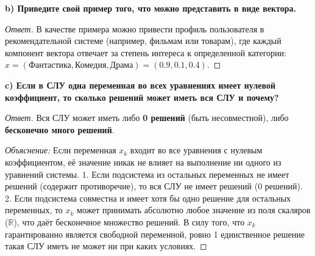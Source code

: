 \documentclass[11pt, a4paper]{article}
\begin{document}
\textbf{b) Приведите свой пример того, что можно представить в виде вектора.}
\begin{proof}[Ответ]
В качестве примера можно привести профиль пользователя в рекомендательной системе (например, фильмам или товарам), где каждый компонент вектора отвечает за степень интереса к определенной категории: $x = (\text{Фантастика}, \text{Комедия}, \text{Драма}) = (0.9, 0.1, 0.4)$.
\end{proof}

\textbf{c) Если в СЛУ одна переменная во всех уравнениях имеет нулевой коэффициент, то сколько решений может иметь вся СЛУ и почему?}
\begin{proof}[Ответ]
Вся СЛУ может иметь либо \textbf{0 решений} (быть несовместной), либо \textbf{бесконечно много решений}. 

\textit{Объяснение:} Если переменная $x_k$ входит во все уравнения с нулевым коэффициентом, её значение никак не влияет на выполнение ни одного из уравнений системы.
1. Если подсистема из остальных переменных не имеет решений (содержит противоречие), то вся СЛУ не имеет решений ($0$ решений).
2. Если подсистема совместна и имеет хотя бы одно решение для остальных переменных, то $x_k$ может принимать абсолютно любое значение из поля скаляров ($\mathbb{R}$), что даёт бесконечное множество решений. В силу того, что $x_k$ гарантированно является свободной переменной, ровно 1 единственное решение такая СЛУ иметь не может ни при каких условиях.
\end{proof}
\end{document}
